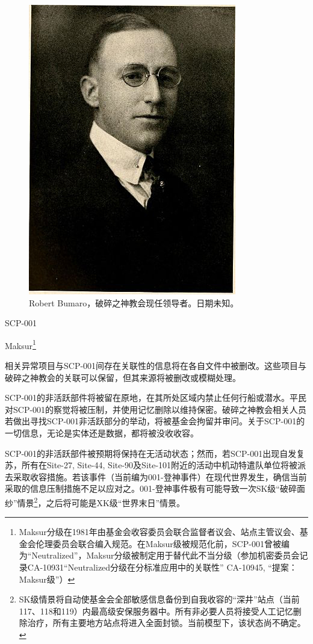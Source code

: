 
\hr

\begin{figure}[H]
	\centering
	\includegraphics[width=0.5\linewidth]{images/SCP.001.the.broken.god.3.jpg}
	\caption*{Robert Bumaro，破碎之神教会现任领导者。日期未知。}
\end{figure}

SCP-001

Maksur\footnote{Maksur分级在1981年由基金会收容委员会联合监督者议会、站点主管议会、基金会伦理委员会联合编入规范。在Maksur级被规范化前，SCP-001曾被编为“Neutralized”，Maksur分级被制定用于替代此不当分级（参加机密委员会记录CA-10931“Neutralized分级在分标准应用中的关联性” CA-10945, “提案：Maksur级”）}

相关异常项目与SCP-001间存在关联性的信息将在各自文件中被删改。这些项目与破碎之神教会的关联可以保留，但其来源将被删改或模糊处理。

SCP-001的非活跃部件将被留在原地，在其所处区域内禁止任何行船或潜水。平民对SCP-001的察觉将被压制，并使用记忆删除以维持保密。破碎之神教会相关人员若做出寻找SCP-001非活跃部分的举动，将被基金会拘留并审问。关于SCP-001的一切信息，无论是实体还是数据，都将被没收收容。

SCP-001的非活跃部件被预期将保持在无活动状态；然而，若SCP-001出现自发复苏，所有在Site-27, Site-44, Site-90及Site-101附近的活动中机动特遣队单位将被派去采取收容措施。若该事件（当前编为001-登神事件）在现代世界发生，确信当前采取的信息压制措施不足以应对之。001-登神事件极有可能导致一次SK级“破碎面纱”情景\footnote{SK级情景将自动使基金会全部敏感信息备份到自我收容的“深井”站点（当前117、118和119）内最高级安保服务器中。所有非必要人员将接受人工记忆删除治疗，所有主要地方站点将进入全面封锁。当前模型下，该状态尚不确定。}，之后将可能是XK级“世界末日”情景。

